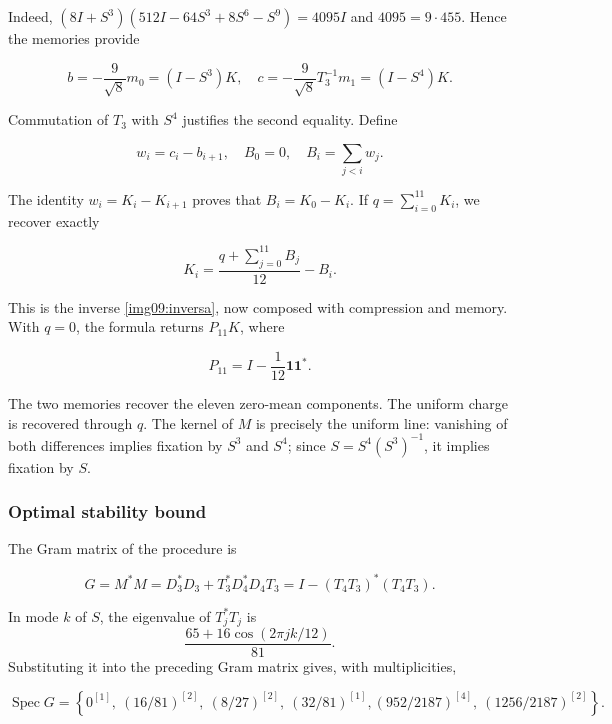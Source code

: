 Indeed, \((8I+S^3)(512I-64S^3+8S^6-S^9)=4095I\) and \(4095=9\cdot455\). Hence the memories provide

\begin{equation}
b=-\frac9{\sqrt8}m_0=(I-S^3)K,
\quad c=-\frac9{\sqrt8}T_3^{-1}m_1=(I-S^4)K.
\label{nuc11:eq:4}
\end{equation}

Commutation of \(T_3\) with \(S^4\) justifies the second equality. Define

\[
w_i=c_i-b_{i+1},\quad B_0=0,\quad
B_i=\sum_{j<i}w_j.
\]

The identity \(w_i=K_i-K_{i+1}\) proves that \(B_i=K_0-K_i\). If \(q=\sum_{i=0}^{11}K_i\), we recover exactly

\begin{equation}
K_i=\frac{q+\sum_{j=0}^{11}B_j}{12}-B_i.
\label{nuc11:eq:5}
\end{equation}

This is the inverse \eqref{img09:inversa}, now composed with compression and memory. With \(q=0\), the formula returns \(P_{11}K\), where

\[
P_{11}=I-\frac1{12}\mathbf1\mathbf1^*.
\]

The two memories recover the eleven zero-mean components. The uniform charge is recovered through \(q\). The kernel of \(M\) is precisely the uniform line: vanishing of both differences implies fixation by \(S^3\) and \(S^4\); since \(S=S^4(S^3)^{-1}\), it implies fixation by \(S\).

\subsubsection{Optimal stability bound}

The Gram matrix of the procedure is

\begin{equation}
G=M^*M=D_3^*D_3+T_3^*D_4^*D_4T_3
=I-(T_4T_3)^*(T_4T_3).
\label{nuc11:eq:6}
\end{equation}

In mode \(k\) of \(S\), the eigenvalue of \(T_j^*T_j\) is
\[
 \frac{65+16\cos(2\pi jk/12)}{81}.
\]
Substituting it into the preceding Gram matrix gives, with multiplicities,

\begin{equation}
\operatorname{Spec}G=\left\{
0^{[1]},\ (16/81)^{[2]},\ (8/27)^{[2]},\ (32/81)^{[1]},
(952/2187)^{[4]},\ (1256/2187)^{[2]}\right\}.
\label{nuc11:eq:7}
\end{equation}

